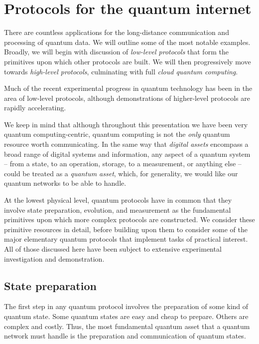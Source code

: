 \documentclass[aps,rmp,twocolumn,amsmath,amssymb,nofootinbib,superscriptaddress]{revtex4}
\begin{document}
%
%

\section{Protocols for the quantum internet}

There are countless applications for the long-distance communication and processing of quantum data. We will outline some of the most notable examples. Broadly, we will begin with discussion of \emph{low-level protocols} that form the primitives upon which other protocols are built. We will then progressively move towards \emph{high-level protocols}, culminating with full \emph{cloud quantum computing}.

Much of the recent experimental progress in quantum technology has been in the area of low-level protocols, although demonstrations of higher-level protocols are rapidly accelerating.

We keep in mind that although throughout this presentation we have been very quantum computing-centric, quantum computing is not the \emph{only} quantum resource worth communicating. In the same way that \emph{digital assets} encompass a broad range of digital systems and information, any aspect of a quantum system -- from a state, to an operation, storage, to a measurement, or anything else -- could be treated as a \emph{quantum asset}, which, for generality, we would like our quantum networks to be able to handle.

At the lowest physical level, quantum protocols have in common that they involve state preparation, evolution, and measurement as the fundamental primitives upon which more complex protocols are constructed. We consider these primitive resources in detail, before building upon them to consider some of the major elementary quantum protocols that implement tasks of practical interest. All of those discussed here have been subject to extensive experimental investigation and demonstration.

%
%

\subsection{State preparation}

The first step in any quantum protocol involves the preparation of some kind of quantum state. Some quantum states are easy and cheap to prepare. Others are complex and costly. Thus, the most fundamental quantum asset that a quantum network must handle is the preparation and communication of quantum states.
\end{document}
